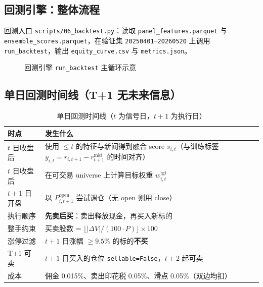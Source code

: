 \documentclass[UTF8,a4paper,12pt]{ctexart}
\begin{document}
\subsection{回测引擎：整体流程}

回测入口 \texttt{scripts/06\_backtest.py}：读取 \texttt{panel\_features.parquet} 与 \texttt{ensemble\_scores.parquet}，在验证集 \texttt{20250401}--\texttt{20260520} 上调用 \texttt{run\_backtest}，输出 \texttt{equity\_curve.csv} 与 \texttt{metrics.json}。

\begin{figure}[H]
\centering
{}
\caption{回测引擎 \texttt{run\_backtest} 主循环示意}
\label{fig:bt-loop}
\end{figure}

\subsection{单日回测时间线（T+1 无未来信息）}

\begin{table}[H]
\centering
\caption{单日回测时间线（$t$ 为信号日，$t\!+\!1$ 为执行日）}
\label{tab:bt-timeline}
\small
\begin{tabular}{p{2.4cm}p{10.2cm}}
\toprule
\textbf{时点} & \textbf{发生什么} \\
\midrule
$t$ 日收盘后 & 使用 $\le t$ 的特征与新闻得到融合 score $s_{i,t}$（与训练标签 $y_{i,t}=r_{i,t+1}-r^{\mathrm{mkt}}_{t+1}$ 的时间对齐） \\
$t$ 日收盘后 & 在可交易 universe 上计算目标权重 $w_{i,t}^{\mathrm{tgt}}$ \\
$t\!+\!1$ 日开盘 & 以 $P_{i,t+1}^{\mathrm{open}}$ 尝试调仓（无 open 则用 close） \\
执行顺序 & \textbf{先卖后买}：卖出释放现金，再买入新标的 \\
整手约束 & 买卖股数 = $\lfloor |\Delta V|/(100\cdot P) \rfloor \times 100$ \\
涨停过滤 & $t\!+\!1$ 日涨幅 $\ge 9.5\%$ 的标的\textbf{不买} \\
T+1 可卖 & $t\!+\!1$ 日买入的仓位 \texttt{sellable=False}，$t\!+\!2$ 起可卖 \\
成本 & 佣金 0.015\%、卖出印花税 0.05\%、滑点 0.05\%（双边均扣） \\
\bottomrule
\end{tabular}
\end{table}
\end{document}
